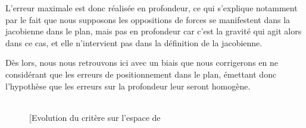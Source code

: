 L'erreur maximale est donc r\'ealis\'ee en profondeur, ce qui s'explique 
notamment par le fait que nous supposons les oppositions de forces se 
manifestent dans la jacobienne dans le plan, mais pas en profondeur car c'est la 
gravit\'e qui agit alors dans ce cas, et elle n'intervient pas dans la 
d\'efinition de la jacobienne.

D\`es lors, nous nous retrouvons ici avec un biais que nous corrigerons en ne 
consid\'erant que les erreurs de positionnement dans le plan, \'emettant donc 
l'hypoth\`ese que les erreurs sur la profondeur leur seront homog\`ene.

\begin{figure}[!htp]
  \centering
\hfill
     \\
\hfill
    \subfloat[Evolution du crit\`ere sur l'espace de 

\end{figure}
